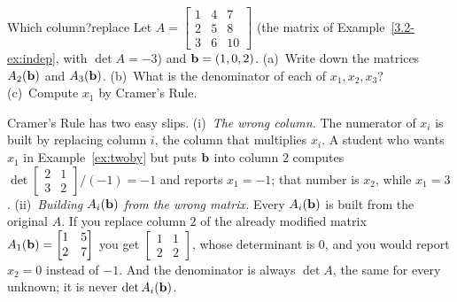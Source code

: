 \documentclass[11pt]{article}
\begin{document}
\begin{kc}{Which column?}{replace}
Let $A=\begin{bmatrix}1&4&7\\2&5&8\\3&6&10\end{bmatrix}$ (the matrix of Example~\ref{3.2-ex:indep}, with $\det A=-3$) and $\mathbf{b}=(1,0,2)$. (a)~Write down the matrices $A_2(\mathbf{b})$ and $A_3(\mathbf{b})$. (b)~What is the denominator of each of $x_1,x_2,x_3$? (c)~Compute $x_1$ by Cramer's Rule.
\end{kc}

\begin{warn}
Cramer's Rule has two easy slips. (i)~\emph{The wrong column.} The numerator of $x_i$ is built by replacing column $i$, the column that multiplies $x_i$. A student who wants $x_1$ in Example~\ref{ex:twoby} but puts $\mathbf{b}$ into column $2$ computes $\det\begin{bmatrix}2&1\\3&2\end{bmatrix}/(-1)=-1$ and reports $x_1=-1$; that number is $x_2$, while $x_1=3$. (ii)~\emph{Building $A_i(\mathbf{b})$ from the wrong matrix.} Every $A_i(\mathbf{b})$ is built from the original $A$. If you replace column $2$ of the already modified matrix $A_1(\mathbf{b})=\begin{bmatrix}1&5\\2&7\end{bmatrix}$ you get $\begin{bmatrix}1&1\\2&2\end{bmatrix}$, whose determinant is $0$, and you would report $x_2=0$ instead of $-1$. And the denominator is always $\det A$, the same for every unknown; it is never $\det A_i(\mathbf{b})$.
\end{warn}
\end{document}
